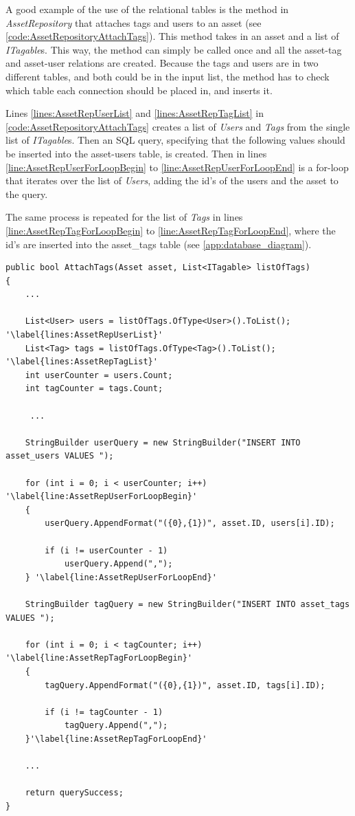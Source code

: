 A good example of the use of the relational tables is the method in \textit{AssetRepository} that attaches tags and users to an asset (see \autoref{code:AssetRepositoryAttachTags}). This method takes in an asset and a list of \textit{ITagable}s. This way, the method can simply be called once and all the asset-tag and asset-user relations are created. Because the tags and users are in two different tables, and both could be in the input list, the method has to check which table each connection should be placed in, and inserts it. 
\par
Lines \ref{lines:AssetRepUserList} and \ref{lines:AssetRepTagList} in \autoref{code:AssetRepositoryAttachTags} creates a list of \textit{Users} and \textit{Tags} from the single list of \textit{ITagable}s.
Then an SQL query, specifying that the following values should be inserted into the asset-users table, is created. Then in lines \ref{line:AssetRepUserForLoopBegin} to \ref{line:AssetRepUserForLoopEnd} is a for-loop that iterates over the list of \textit{Users}, adding the id's of the users and the asset to the query. 
\par
The same process is repeated for the list of \textit{Tags} in lines \ref{line:AssetRepTagForLoopBegin} to \ref{line:AssetRepTagForLoopEnd}, where the id's are inserted into the asset\_tags table (see \autoref{app:database_diagram}).

\begin{listing}[H]
\begin{verbatim}
public bool AttachTags(Asset asset, List<ITagable> listOfTags)
{
    ...
        
    List<User> users = listOfTags.OfType<User>().ToList(); '\label{lines:AssetRepUserList}'
    List<Tag> tags = listOfTags.OfType<Tag>().ToList(); '\label{lines:AssetRepTagList}'
    int userCounter = users.Count;
    int tagCounter = tags.Count;
        
     ...

    StringBuilder userQuery = new StringBuilder("INSERT INTO asset_users VALUES ");

    for (int i = 0; i < userCounter; i++) '\label{line:AssetRepUserForLoopBegin}'
    {
        userQuery.AppendFormat("({0},{1})", asset.ID, users[i].ID);

        if (i != userCounter - 1)
            userQuery.Append(",");
    } '\label{line:AssetRepUserForLoopEnd}'

    StringBuilder tagQuery = new StringBuilder("INSERT INTO asset_tags VALUES ");

    for (int i = 0; i < tagCounter; i++) '\label{line:AssetRepTagForLoopBegin}'
    {
        tagQuery.AppendFormat("({0},{1})", asset.ID, tags[i].ID);
        
        if (i != tagCounter - 1)
            tagQuery.Append(",");
    }'\label{line:AssetRepTagForLoopEnd}'
            
    ...
       
    return querySuccess;
}
\end{verbatim}
\label{code:AssetRepositoryAttachTags}
\end{listing}